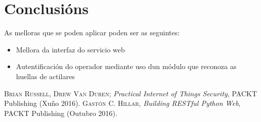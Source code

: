 \documentclass[11pt,twoside]{book}
\begin{document}
\chapter{Conclusións}

As melloras que se poden aplicar poden ser as seguintes:

\begin{itemize}
    \item Mellora da interfaz do servicio web
    \item Autentificación do operador mediante uso dun módulo que reconoza as huellas de actilares
\end{itemize}


\begin{thebibliography}{99}

 \textsc{Brian Russell, Drew Van Duren}; \textit{Practical Internet of Things Security}, PACKT Publishing (Xuño 2016).
 \textsc{Gastón C. Hillar}, \emph{Building RESTful Python Web}, PACKT Publishing (Outubro 2016).
					
\end{thebibliography}

\stopcontents[parts]

\cleardoublepage
\renewcommand{\documento}{ANEXOS}
\end{document}
